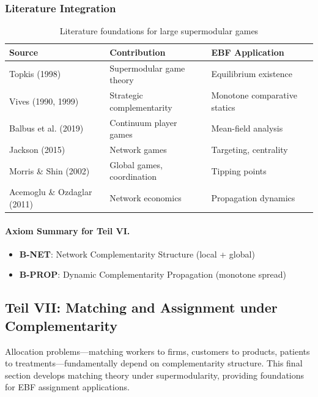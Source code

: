 \subsubsection{Literature Integration}

\begin{table}[h]
\centering
\small
\begin{tabular}{p{3.5cm}p{4cm}p{5cm}}
\toprule
\textbf{Source} & \textbf{Contribution} & \textbf{EBF Application} \\
\midrule
Topkis (1998) & Supermodular game theory & Equilibrium existence \\
Vives (1990, 1999) & Strategic complementarity & Monotone comparative statics \\
Balbus et al. (2019) & Continuum player games & Mean-field analysis \\
Jackson (2015) & Network games & Targeting, centrality \\
Morris \& Shin (2002) & Global games, coordination & Tipping points \\
Acemoglu \& Ozdaglar (2011) & Network economics & Propagation dynamics \\
\bottomrule
\end{tabular}
\caption{Literature foundations for large supermodular games}
\label{tab:large-games-lit}
\end{table}

\paragraph{Axiom Summary for Teil VI.}

\begin{itemize}
    \item \textbf{B-NET}: Network Complementarity Structure (local + global)
    \item \textbf{B-PROP}: Dynamic Complementarity Propagation (monotone spread)
\end{itemize}




\subsection{Teil VII: Matching and Assignment under Complementarity}
\label{sec:matching}

Allocation problems---matching workers to firms, customers to products, patients to 
treatments---fundamentally depend on complementarity structure. This final section 
develops matching theory under supermodularity, providing foundations for EBF 
assignment applications.

